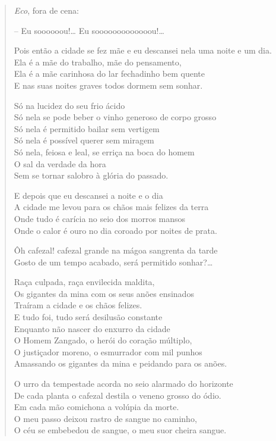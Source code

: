 \begin{verse}
\quad\quad\emph{Eco}, fora de cena:

\quad\quad\quad\quad{}-- Eu soooooou!\ldots{} Eu sooooooooooooou!\ldots{}

Pois então a cidade se fez mãe e eu descansei nela uma noite e um dia.\\
Ela é a mãe do trabalho, mãe do pensamento,\\
Ela é a mãe carinhosa do lar fechadinho bem quente\\
E nas suas noites graves todos dormem sem sonhar.

Só na lucidez do seu frio ácido\\
Só nela se pode beber o vinho generoso de corpo grosso\\
Só nela é permitido bailar sem vertigem\\
Só nela é possível querer sem miragem\\
Só nela, feiosa e leal, se erriça na boca do homem\\
O sal da verdade da hora\\
Sem se tornar salobro à glória do passado.

E depois que eu descansei a noite e o dia\\
A cidade me levou para os chãos mais felizes da terra\\
Onde tudo é carícia no seio dos morros mansos\\
Onde o calor é ouro no dia coroado por noites de prata.

Ôh cafezal! cafezal grande na mágoa sangrenta da tarde\\
Gosto de um tempo acabado, será permitido sonhar?\ldots{}

Raça culpada, raça envilecida maldita,\\
Os gigantes da mina com os seus anões ensinados\\
Traíram a cidade e os chãos felizes.\\
E tudo foi, tudo será desilusão constante\\
Enquanto não nascer do enxurro da cidade\\
O Homem Zangado, o herói do coração múltiplo,\\
O justiçador moreno, o esmurrador com mil punhos\\
Amassando os gigantes da mina e peidando para os anões.

O urro da tempestade acorda no seio alarmado do horizonte\\
De cada planta o cafezal destila o veneno grosso do ódio.\\
Em cada mão comichona a volúpia da morte.\\
O meu passo deixou rastro de sangue no caminho,\\
O céu se embebedou de sangue, o meu suor cheira sangue.


\end{verse}
